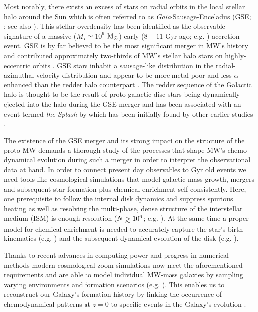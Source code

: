 \documentclass[useAMS,usenatbib]{mnras}
\def\gtrsim{\mathrel{\hbox{\rlap{\hbox{\lower4pt\hbox{$\sim$}}}\hbox{$>$}}}}
\begin{document}
Most notably, there exists an excess of stars on radial orbits in the local stellar halo around the Sun which is often referred to as {\it Gaia}-Sausage-Enceladus (GSE; \citealt{Belokurov2018, Helmi2018}; see also \citealt{Nissen2010, Koppelman2018, Haywood2018}). This stellar overdensity has been identified as the observable signature of a massive ($M_{\star} \simeq 10^{9}$ $\rm{M_{\odot}}$) early ($8-11$ Gyr ago; e.g. \citealt{Vincenzo2019, Belokurov2020, Naidu2021, Xiang2022}) accretion event. GSE is by far believed to be the most significant merger in MW's history and contributed approximately two-thirds of MW's stellar halo stars on highly-eccentric orbits \citep[e.g.][]{Mackereth2020}. GSE stars inhabit a sausage-like distribution in the radial-azimuthal velocity distribution \citep{Brook2003, Belokurov2018} and appear to be more metal-poor and less $\alpha$-enhanced than the redder halo counterpart \citep{Haywood2018, Helmi2018}. The redder sequence of the Galactic halo is thought to be the result of proto-galactic disc stars being dynamically ejected into the halo during the GSE merger and has been associated with an event termed {\it the Splash} by \cite{Belokurov2020, Bonaca2020} which has been initially found by other earlier studies \citep{Bonaca2017, Haywood2018, DiMatteo2019, Gallart2019}. 

The existence of the GSE merger and its strong impact on the structure of the proto-MW demands a thorough study of the processes that shape MW's chemo-dynamical evolution during such a merger in order to interpret the observational data at hand. In order to connect present day observables to Gyr old events we need tools like cosmological simulations that model galactic mass growth, mergers and subsequent star formation plus chemical enrichment self-consistently. Here, one prerequisite to follow the internal disk dynamics and suppress spurious heating as well as resolving the multi-phase, dense structure of the interstellar medium (ISM) is enough resolution ($N \gtrsim 10^6$; e.g. \citealt{Sellwood2013,Ludlow2019,Ludlow2021}). At the same time a proper model for chemical enrichment \citep[e.g.][]{Buck2021} is needed to accurately capture the star's birth kinematics (e.g. \citealt{Ratcliffe2022, Lu2022}) and the subsequent dynamical evolution of the disk (e.g. \citealt{House2011, Bird2013, Buck2020a}).

Thanks to recent advances in computing power and progress in numerical methods modern cosmological zoom simulations now meet the aforementioned requirements and are able to model individual MW-mass galaxies by sampling varying environments and formation scenarios (e.g. \citealt{Sawala2016, Grand2017, Buck2020a, Font2020, Applebaum2021, Agertz2021, Bird2021, Khoperskov2022-InSitu}). This enables us to reconstruct our Galaxy's formation history by linking the occurrence of chemodynamical patterns at $z=0$ to specific events in the Galaxy's evolution \citep[e.g.][]{Bignone2019, Fattahi2019, Grand2020, Elias2020, Dillamore2022, Khoperskov2022a, Rey2022}.
\end{document}
